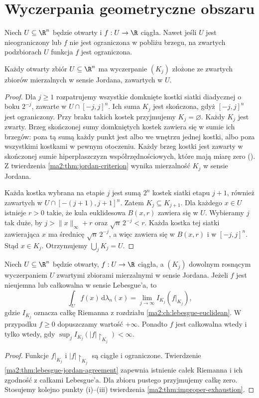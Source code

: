\section{Wyczerpania geometryczne obszaru}

Niech $U\subseteq\R^n$ będzie otwarty i
$f:U\to\R$ ciągła. Nawet jeśli $U$ jest
nieograniczony lub $f$ nie jest ograniczona
w pobliżu brzegu, na zwartych podzbiorach
$U$ funkcja $f$ jest ograniczona.

\begin{lemat}
\label{ma2:lem:improper-jordan-exhaustion}
Każdy otwarty zbiór $U\subseteq\R^n$ ma
wyczerpanie $(K_j)$ złożone ze zwartych
zbiorów mierzalnych w sensie Jordana,
zawartych w $U$.
\end{lemat}
\begin{proof}
Dla $j\ge1$ rozpatrujemy wszystkie domknięte
kostki siatki diadycznej o boku $2^{-j}$,
zawarte w $U\cap[-j,j]^n$.
Ich suma $K_j$ jest skończona, gdyż
$[-j,j]^n$ jest ograniczony. Przy braku
takich kostek przyjmujemy $K_j=\varnothing$.
Każdy $K_j$ jest zwarty. Brzeg skończonej
sumy domkniętych kostek zawiera się w sumie
ich brzegów: poza tą sumą każdy punkt jest
albo we wnętrzu jednej kostki, albo poza
wszystkimi kostkami w pewnym otoczeniu.
Każdy brzeg kostki jest zawarty w skończonej
sumie hiperpłaszczyzn współrzędnościowych,
które mają miarę zero
().
Z twierdzenia \ref{ma2:thm:jordan-criterion}
wynika mierzalność $K_j$ w sensie Jordana.

Każda kostka wybrana na etapie $j$ jest sumą
$2^n$ kostek siatki etapu $j+1$, również
zawartych w $U\cap[-(j+1),j+1]^n$.
Zatem $K_j\subseteq K_{j+1}$.
Dla każdego $x\in U$ istnieje $r>0$
takie, że kula euklidesowa $B(x,r)$
zawiera się w $U$. Wybieramy $j$
tak duże, by $j>\|x\|_\infty+r$
oraz $\sqrt n\,2^{-j}<r$.
Każda kostka tej siatki zawierająca $x$
ma średnicę $\sqrt n\,2^{-j}$,
a więc zawiera się w $B(x,r)$
i w $[-j,j]^n$. Stąd $x\in K_j$.
Otrzymujemy $\bigcup_j K_j=U$.
\end{proof}

\begin{wniosek}
\label{ma2:cor:improper-riemann-exhaustion}
Niech $U\subseteq\R^n$ będzie otwarty,
$f:U\to\R$ ciągła, a $(K_j)$ dowolnym
rosnącym wyczerpaniem $U$ zwartymi zbiorami
mierzalnymi w sensie Jordana.
Jeżeli $f$ jest nieujemna lub całkowalna
w sensie Lebesgue'a, to
\[
 \int_U f(x)\,\mathrm d\lambda_n(x)
 =\lim_{j\to\infty} I_{K_j}(f|_{K_j}),
\]
gdzie $I_{K_j}$ oznacza całkę Riemanna
z rozdziału \ref{ma2:ch:lebesgue-euclidean}.
W przypadku $f\ge0$ dopuszczamy wartość $+\infty$.
Ponadto $f$ jest całkowalna wtedy i tylko wtedy,
gdy $\sup_j I_{K_j}(|f|\restriction_{K_j})<\infty$.
\end{wniosek}
\begin{proof}
Funkcje $f|_{K_j}$ i $|f|\restriction_{K_j}$ są ciągłe
i ograniczone. Twierdzenie
\ref{ma2:thm:lebesgue-jordan-agreement}
zapewnia istnienie całek Riemanna i ich
zgodność z całkami Lebesgue'a. Dla zbioru
pustego przyjmujemy całkę zero.
Stosujemy kolejno punkty (i)--(iii)
twierdzenia \ref{ma2:thm:improper-exhaustion}.
\end{proof}

